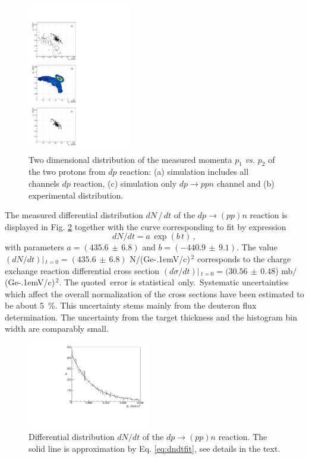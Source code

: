 \documentclass[twocolumn,epjc3]{svjour3}
\newcommand{\dpfrag} {\ensuremath{dp \rightarrow ppn}\xspace}
\newcommand{\dpchex} {\ensuremath{dp \rightarrow (pp)n}\xspace}
\newcommand{\GeVc}   {Ge\kern-.1emV/c\xspace}
\begin{document}
\begin{figure}[t]
  \centering
  \includegraphics[width=0.41\textwidth]{p1_vs_p2_1.pdf} %
  \caption{Two dimensional distribution of the measured momenta $p_1$
    \textit{vs.} $p_2$ of the two protons from $dp$ reaction: (a) simulation
    includes all channels $dp$ reaction, (c) simulation only \dpfrag channel and
    (b) experimental distribution.}
  \label{fig:p1vsp2}
\end{figure}

The measured differential distribution $dN\,/\,dt$ of the \dpchex reaction is
displayed in Fig. \ref{fig:dndt} together with the curve corresponding to fit by
expression
\begin{equation}
  \label{eq:dndtfit}
  dN/dt = a\,\exp(b\,t)\,,
\end{equation}
with parameters $a=(435.6\,\pm\,6.8)$ and $b=(-440.9\,\pm\,9.1)$. The value
$(dN/dt)|\,_{t=0}=(435.6\,\pm\,6.8)$ N$/$(\GeVc)$^{\,2}$ corresponds to the
charge exchange reaction differential cross section
$(d\sigma/dt)|\,_{t=0}=(30.56\,\pm\,0.48$) mb$/$(\GeVc)$^{\,2}$.
The quoted \,error is statistical \,only. \,Systematic uncertainties which
affect the overall normalization of the cross sections have been estimated to be
about 5~\%. This uncertainty stems mainly from the deuteron flux
determination. The uncertainty from the target thickness and the histogram bin
width are comparably small.

\begin{figure}[h]
  \centering
  \includegraphics[width=0.48\textwidth]{dp_dN.pdf}
  \caption{Differential distribution $dN/dt$ of the \dpchex reaction. The solid
    line is approximation by Eq. \eqref{eq:dndtfit}, see details in the text.}
  \label{fig:dndt}
\end{figure}
\end{document}
